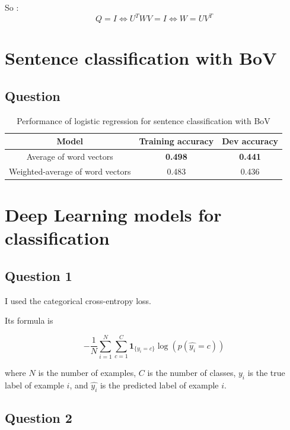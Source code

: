 \documentclass[11pt]{enpc-article}
\begin{document}
So :
$$
  Q = I \Leftrightarrow U^T W V = I \Leftrightarrow W = U V^T
$$

\section{Sentence classification with BoV}

\subsection*{Question}

\begin{table}[H]
  \centering
  \begin{tabular}{|c|c|c|}
  \hline
  \textbf{Model}                   & \textbf{Training accuracy} & \textbf{Dev accuracy} \\
  \hline
  Average of word vectors          & \textbf{0.498}             & \textbf{0.441} \\
  Weighted-average of word vectors & 0.483                      & 0.436          \\
  \hline
  \end{tabular}
  \caption{Performance of logistic regression for sentence classification with BoV}
\end{table}

\section{Deep Learning models for classification}

\subsection*{Question 1}

I used the categorical cross-entropy loss.

Its formula is

$$
  - \frac{1}{N} \sum_{i = 1}^N \sum_{c = 1}^C \mathbf{1}_{\{y_i = c \}} \log(p(\hat{y_i} = c))
$$

where $N$ is the number of examples, $C$ is the number of classes, $y_i$ is the true label of example $i$, and $\hat{y_i}$ is the predicted label of example $i$.

\subsection*{Question 2}
\end{document}
